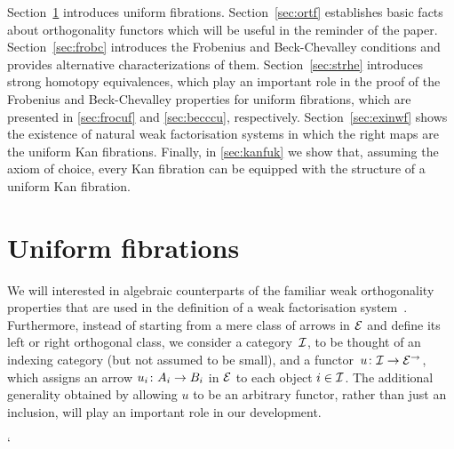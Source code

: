 \documentclass[reqno,10pt,a4paper,oneside,draft]{amsart}
\begin{document}

Section~\ref{sec:unif} introduces uniform fibrations.
Section~\ref{sec:ortf} establishes basic facts about orthogonality functors which will be useful in the reminder of the paper.
Section~\ref{sec:frobc} introduces the Frobenius and Beck-Chevalley conditions and provides alternative characterizations of them.
Section~\ref{sec:strhe} introduces strong homotopy equivalences, which play an important role in the proof of the Frobenius and Beck-Chevalley properties for uniform fibrations, which are presented in \cref{sec:frocuf} and \cref{sec:becccu}, respectively.
Section~\ref{sec:exinwf} shows the existence of natural weak factorisation systems in which the right maps are the uniform Kan fibrations.
Finally, in \cref{sec:kanfuk} we show that, assuming the axiom of choice, every Kan fibration can be equipped with the structure of a uniform Kan fibration.


\section{Uniform fibrations}
\label{sec:unif}

We will interested in algebraic counterparts of the familiar weak orthogonality properties that are used in the definition of a weak factorisation system~\cite{bousfield-wfs}.
Furthermore, instead of starting from a mere class of arrows in $\catE$ and define its left or right orthogonal class, we consider a category~$\cal{I}$, to be thought of an indexing category (but not assumed to be small), and a functor~$u \co \cal{I} \to \catE^\to$, which assigns an arrow $u_i \co A_i \to B_i$ in $\catE$ to each object $i \in \cal{I}$.
The additional generality obtained by allowing $u$ to be an arbitrary functor, rather than just an inclusion, will play an important role in our development.

`
\end{document}
